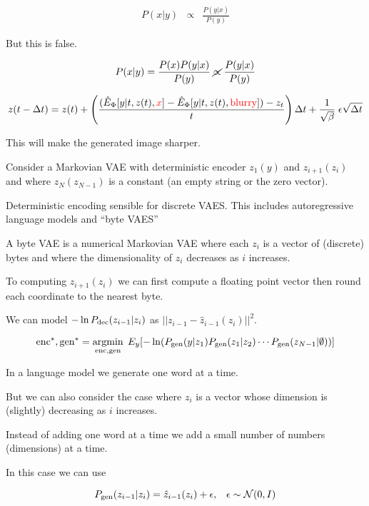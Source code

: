{\vfill
{\huge \begin{eqnarray*}
P(x|y) & \propto & \frac{P(y|x)}{P(y)}
\end{eqnarray*}}

\vfill
But this is false.

\vfill
{\huge $$P(x|y) = \frac{P(x)P(y|x)}{P(y)} \;\cancel{\propto}\;\frac{P(y|x)}{P(y)}$$}


{\huge $$z(t - \Delta t) = z(t) + \left(\frac{(\hat{E}_\Phi[y|t,z(t),{\color{red} x}] - \hat{E}_\Phi[y|t,z(t),{\color{red} \mathrm{blurry}}]) - z_t}{t}\right)\Delta t
+ \frac{1}{\sqrt{\beta}}\;\epsilon\sqrt{\Delta t}$$}

\vfill
This will make the generated image sharper.


Consider a Markovian VAE with deterministic encoder $z_1(y)$ and $z_{i+1}(z_i)$ and where $z_N(z_{N-1})$ is a constant (an empty string or the zero vector).

\vfill
Deterministic encoding sensible for discrete VAES.  This includes autoregressive language models and ``byte VAES''

\vfill
A byte VAE is a numerical Markovian VAE where each $z_i$ is a vector of (discrete) bytes and where the dimensionality of $z_i$
decreases as $i$ increases.

\vfill
To computing $z_{i+1}(z_i)$ we can first compute a floating point vector then round each coordinate to the nearest byte.

\vfill
We can model $-\ln P_{\mathrm{dec}}(z_{i-1}|z_i)$ as $||z_{i-1} - \hat{z}_{i-1}(z_i)||^2$.


{\huge
$$\mathrm{enc}^*,\mathrm{gen}^* = \operatorname*{argmin}_{\mathrm{enc},\mathrm{gen}} \;E_y[- \ln (P_{\mathrm{gen}}(y|z_1)P_{\mathrm{gen}}(z_1|z_2)\cdots P_{\mathrm{gen}}(z_{N-1}|\emptyset))]$$
}

\vfill
In a language model we generate one word at a time.

\vfill
But we can also consider the case where $z_i$ is a vector whose dimension is (slightly) decreasing as $i$ increases.

\vfill
Instead of adding one word at a time we add a small number of numbers (dimensions) at a time.

\vfill
In this case we can use

$$P_{\mathrm{gen}}(z_{i-1}|z_i) = \hat{z}_{i-1}(z_i) + \epsilon,\;\;\;\epsilon\sim {\cal N}(0,I)$$

}
